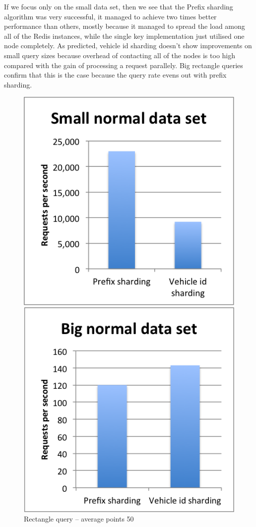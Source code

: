 \documentclass[times, utf8, diplomski]{fer}
\begin{document}
If we focus only on the small data set, then we see that the Prefix sharding algorithm was very successful, it managed to achieve two times better performance than others, mostly because it managed to spread the load among all of the Redis instances, while the single key implementation just utilised one node completely. As predicted, vehicle id sharding doesn't show improvements on small query sizes because overhead of contacting all of the nodes is too high compared with the gain of processing a request parallely. Big rectangle queries confirm that this is the case because the query rate evens out with prefix sharding.

\begin{figure}[h]
\includegraphics[width=\textwidth]{rectangle_small_normal}
\caption{Rectangle query -- average points 50}
\label{small_normal}
\endminipage\hfill
{}
\includegraphics[width=\textwidth]{rectangle_big_normal}

\end{figure}
\end{document}
